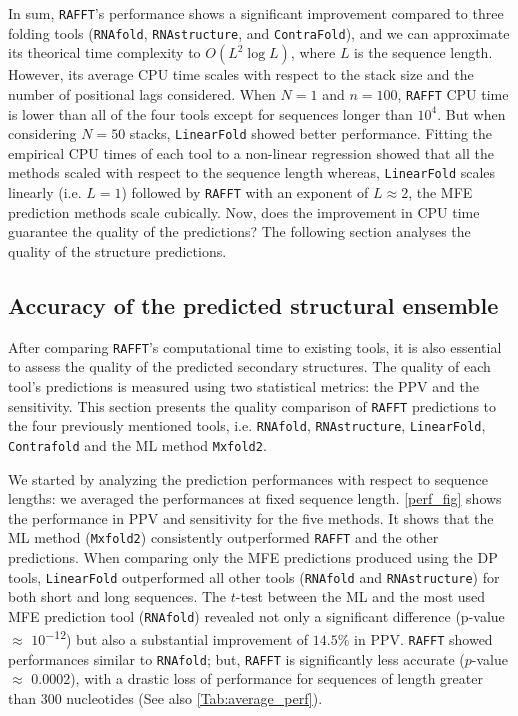 In sum, \texttt{RAFFT}'s performance shows a significant improvement compared to three folding tools (\texttt{RNAfold}, \texttt{RNAstructure}, and \texttt{ContraFold}), and we can approximate its theorical time complexity to $O(L^2\log L)$, where $L$ is the sequence length. However, its average CPU time scales with respect to the stack size and the number of positional lags considered. When $N=1$ and $n=100$, \texttt{RAFFT} CPU time is lower than all of the four tools except for sequences longer than $10^4$. But when considering $N=50$ stacks, \texttt{LinearFold} showed better performance.  Fitting the empirical CPU times of each tool to a non-linear regression showed that all the methods scaled with respect to the sequence length whereas, \texttt{LinearFold} scales linearly (i.e. $L=1$) followed by \texttt{RAFFT} with an exponent of $L\approx2$, the \ac{MFE} prediction methods scale cubically. Now, does the improvement in CPU time guarantee the quality of the predictions? The following section analyses the quality of the structure predictions.

\subsection{Accuracy of the predicted structural ensemble}

After comparing \texttt{RAFFT}'s computational time to existing tools, it is also essential to assess the quality of the predicted secondary structures. The quality of each tool's predictions is measured using two statistical metrics: the \ac{PPV} and the sensitivity. This section presents the quality comparison of \texttt{RAFFT} predictions to the four previously mentioned tools,  i.e. \texttt{RNAfold}, \texttt{RNAstructure}, \texttt{LinearFold}, \texttt{Contrafold} and the \ac{ML} method \texttt{Mxfold2}. 

We started by analyzing the prediction performances with respect to sequence lengths: we averaged the performances at fixed sequence length. \autoref{perf_fig} shows the performance in \ac{PPV} and sensitivity for the five methods. It shows that the \ac{ML} method (\texttt{Mxfold2}) consistently outperformed \texttt{RAFFT} and the other predictions. When comparing only the \ac{MFE} predictions produced using the \ac{DP} tools, \texttt{LinearFold} outperformed all other tools (\texttt{RNAfold} and \texttt{RNAstructure}) for both short and long sequences. The $t$-test between the \ac{ML} and the most used \ac{MFE} prediction tool (\texttt{RNAfold}) revealed not only a significant difference (p-value \(\approx\) $10$\textsuperscript{$-12$}) but also a substantial improvement of $14.5\%$ in \ac{PPV}. \texttt{RAFFT} showed performances similar to \texttt{RNAfold}; but, \texttt{RAFFT} is significantly less accurate ($p$-value \(\approx\) $0.0002$), with a drastic loss of performance for sequences of length greater than $300$ nucleotides (See also \autoref{Tab:average_perf}).

